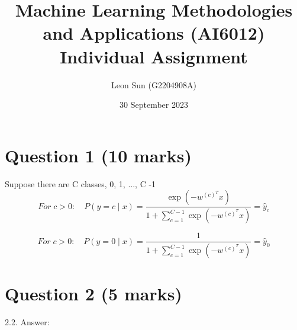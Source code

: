 \documentclass{article}
\title{ Machine Learning Methodologies and Applications (AI6012) Individual Assignment}
\author{Leon Sun (G2204908A)}
\date{30 September 2023}
\begin{document}
\maketitle
 

\section{Question 1 (10 marks)}

Suppose there are C classes, {0, 1, ..., C -1}
\begin{equation}
    For\;c>0: \quad P(y=c \mid x)=\frac{\exp \left(-w^{(c)^T} x\right)}{1+\sum_{c=1}^{C-1} \exp \left(-w^{(c)^T} x\right)}=\hat{y}_c
    \end{equation}

\begin{equation}
    For\;c>0: \quad P(y=0 \mid x)=\frac{1}{1+\sum_{c=1}^{C-1} \exp \left(-w^{(c)^T} x\right)}=\hat{y}_0
    \end{equation}

\section{Question 2 (5 marks)}


2.2. Answer:

\begin{table}[!hbt]
    \centering
    \caption{Classification accuracy on running linear kernel SVM on 3-fold cross-validation using training set with different values of the parameter C in \{0.01, 0.05, 0.1, 0.5, 1\}}
    \label{tab:linearSVM}
\end{table}
\end{document}
